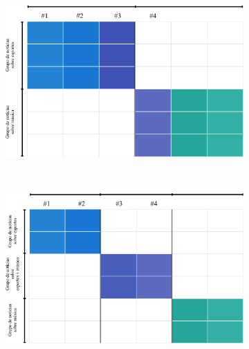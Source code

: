 \documentclass[
    12pt,                %
    oneside,            %
    a4paper,            %
    english,            %
    brazil                %
    ]{abntex2ppgsi}
\begin{document}
\begin{figure} [htpb]
\centering
 \caption{
        Representação de uma aplicação de mineração de dados implementado a partir de análise de agrupamento com similaridade total (a) e similaridade parcial (b,c). Os grupos são diferenciados por cores.
    }
    \begin{subfigure}[b]{0.45\textwidth}
        \includegraphics[width=\textwidth]{img/sistema0.png}
        \caption{}
        \label{fig:sistema:a}
    \end{subfigure}
    ~
    \begin{subfigure}[b]{0.45\textwidth}
        \includegraphics[width=\textwidth]{img/sistema1.png}
        \caption{}
        \label{fig:sistema:b}
    \end{subfigure}
    ~
    \begin{subfigure}[b]{0.45\textwidth}

\end{subfigure}
\end{figure}
\end{document}
